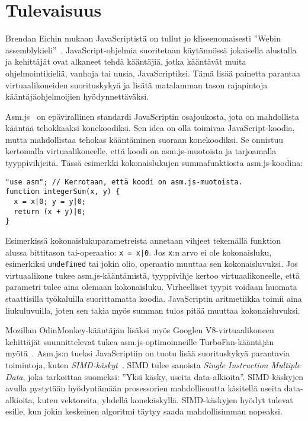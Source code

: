 \section{Tulevaisuus}

Brendan Eichin mukaan JavaScriptistä on tullut jo kliseenomaisesti ''Webin assemblykieli''~\cite{webassembly}. JavaScript-ohjelmia suoritetaan käytännössä jokaisella alustalla ja kehittäjät ovat alkaneet tehdä kääntäjiä, jotka kääntävät muita ohjelmointikieliä, vanhoja tai uusia, JavaScriptiksi. Tämä lisää painetta parantaa virtuaalikoneiden suorituskykyä ja lisätä matalamman tason rajapintoja kääntäjäohjelmoijien hyödynnettäväksi.

Asm.js~\cite{asmjs} on epävirallinen standardi JavaScriptin osajoukosta, jota on mahdollista kääntää tehokkaaksi konekoodiksi. Sen idea on olla toimivaa JavaScript-koodia, mutta mahdollistaa tehokas kääntäminen suoraan konekoodiksi. Se onnistuu kertomalla virtuaalikoneelle, että koodi on asm.js-muotoista ja tarjoamalla tyyppivihjeitä. Tässä esimerkki kokonaislukujen summafunktiosta asm.js-koodina:
\begin{lstlisting}
"use asm"; // Kerrotaan, että koodi on asm.js-muotoista.
function integerSum(x, y) {
  x = x|0; y = y|0;
  return (x + y)|0;
}
\end{lstlisting}
Esimerkissä kokonaislukuparametreista annetaan vihjeet tekemällä funktion alussa bittitason tai-operaatio: \texttt{x = x|0}. Jos \texttt{x}:n arvo ei ole kokonaisluku, esimerkiksi \texttt{undefined} tai jokin olio, operaatio muuttaa sen kokonaisluvuksi. Jos virtuaalikone tukee asm.js-kääntämistä, tyyppivihje kertoo virtuaalikoneelle, että parametri tulee aina olemaan kokonaisluku. Virheelliset tyypit voidaan huomata staattisilla työkaluilla suorittamatta koodia. JavaScriptin aritmetiikka toimii aina liukuluvuilla, joten sen takia myös summan tulos pitää muuttaa kokonaisluvuksi.

Mozillan OdinMonkey-kääntäjän lisäksi myös Googlen V8-virtuaalikoneen kehittäjät suunnittelevat tukea asm.js-optimoinneille TurboFan-kääntäjän myötä~\cite{turbofan}. Asm.js:n tueksi JavaScriptiin on tuotu lisää suorituskykyä parantavia toimintoja, kuten \textit{SIMD-käskyt}~\cite{webassembly}. SIMD tulee sanoista \textit{Single Instruction Multiple Data}, joka tarkoittaa suomeksi: ''Yksi käsky, useita data-alkioita''. SIMD-käskyjen avulla pystytään hyödyntämään prosessorien mahdollisuutta käsitellä useita data-alkioita, kuten vektoreita, yhdellä konekäskyllä. SIMD-käskyjen hyödyt tulevat esille, kun jokin keskeinen algoritmi täytyy saada mahdollisimman nopeaksi.


